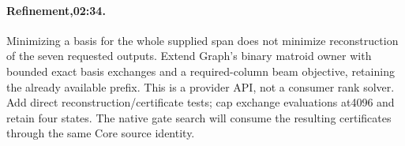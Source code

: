 \documentclass{article}
\begin{document}
\paragraph{Refinement,02:34.} Minimizing a basis for the whole supplied span
does not minimize reconstruction of the seven requested outputs. Extend Graph's
binary matroid owner with bounded exact basis exchanges and a required-column
beam objective, retaining the already available prefix. This is a provider API,
not a consumer rank solver. Add direct reconstruction/certificate tests; cap
exchange evaluations at4096 and retain four states. The native gate search will
consume the resulting certificates through the same Core source identity.
\begin{center}\end{center}
\end{document}
